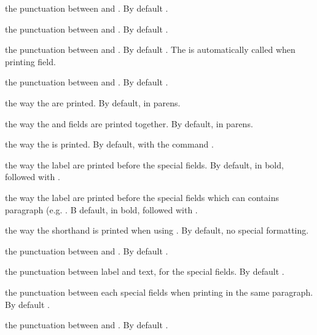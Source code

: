 \documentclass{ltxdockit}[2011/03/25]
\begin{document}
\begin{ltxsyntax}
 the punctuation between  and . By default .

 the punctuation between  and . By default .

 the punctuation between  and . By default . The  is automatically called when printing  field. 

 the punctuation between  and . By default .

 the way the  are printed. By default, in parens.

 the way the  and  fields are printed together. By default, in parens.

 the way the  is printed. By default, with the command .

 the way the label are printed before the special fields. By default, in bold, followed with .

 the way the label are printed before the special fields which can contains paragraph (e.g. .
B default, in bold, followed with .

 the way the shorthand is printed when using . By default, no special formatting.

 the punctuation between  and .  By default .

 the punctuation between label and text, for the special fields. By default .

 the punctuation between each special fields when printing in the same paragraph. By default .

 the punctuation between  and . By default .
\end{ltxsyntax}
\end{document}
